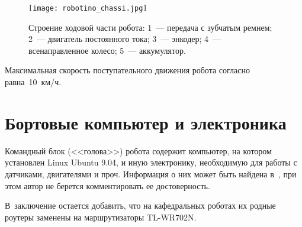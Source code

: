 \begin{figure}[h]
	\centering
	\texttt{[image: robotino\_chassi.jpg]}
	\caption{Строение ходовой части робота: 1~--- передача с зубчатым ремнем; 2~--- двигатель постоянного тока; 3~--- энкодер; 4~--- всенаправленное колесо; 5~--- аккумулятор.}
	\label{img_robotinos_chassis}
\end{figure}

Максимальная скорость поступательного движения робота согласно~\cite{festo_page_with_robotino_until_2013} равна~10~км/ч.



\section{Бортовые компьютер и электроника}
Командный блок (<<голова>>) робота содержит компьютер, на котором установлен Linux Ubuntu 9.04, и иную электронику, необходимую для работы с датчиками, двигателями и проч.
Информация о них может быть найдена в~\cite{history_hard_page, festo_page_with_robotino_until_2013, main_manual}, при этом автор не берется комментировать ее достоверность.

В~заключение остается добавить, что на кафедральных роботах их родные роутеры заменены на маршрутизаторы TL-WR702N.



